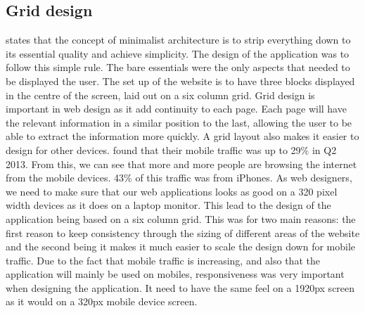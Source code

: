 \subsection{Grid design}
\citet{bertoni:2002} states that the concept of minimalist architecture is to strip everything down to its essential quality and achieve simplicity. The design of the application was to follow this simple rule. The bare essentials were the only aspects that needed to be displayed the user. The set up of the website is to have three blocks displayed in the centre of the screen, laid out on a six column grid. Grid design is important in web design as it add continuity to each page. Each page will have the relevant information in a similar position to the last, allowing the user to be able to extract the information more quickly. A grid layout also makes it easier to design for other devices. \citet{walkers:2013} found that their mobile traffic was up to 29\% in Q2 2013. From this, we can see that more and more people are browsing the internet from the mobile devices. 43\% of this traffic was from iPhones. As web designers, we need to make sure that our web applications looks as good on a 320 pixel width devices as it does on a laptop monitor. This lead to the design of the application being based on a six column grid. This was for two main reasons: the first reason to keep consistency through the sizing of different areas of the website and the second being it makes it much easier to scale the design down for mobile traffic. Due to the fact that mobile traffic is increasing, and also that the application will mainly be used on mobiles, responsiveness was very important when designing the application. It need to have the same feel on a 1920px screen as it would on a 320px mobile device screen.\\

